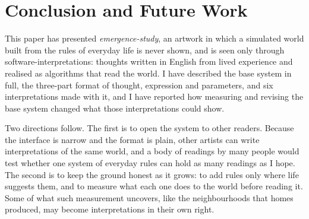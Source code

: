 \section{Conclusion and Future Work}
\label{sec:conclusion}

This paper has presented \emph{emergence-study}, an artwork in which a simulated world built from the rules of everyday life is never shown, and is seen only through software-interpretations: thoughts written in English from lived experience and realised as algorithms that read the world. I have described the base system in full, the three-part format of thought, expression and parameters, and six interpretations made with it, and I have reported how measuring and revising the base system changed what those interpretations could show.

Two directions follow. The first is to open the system to other readers. Because the interface is narrow and the format is plain, other artists can write interpretations of the same world, and a body of readings by many people would test whether one system of everyday rules can hold as many readings as I hope. The second is to keep the ground honest as it grows: to add rules only where life suggests them, and to measure what each one does to the world before reading it. Some of what such measurement uncovers, like the neighbourhoods that homes produced, may become interpretations in their own right.

